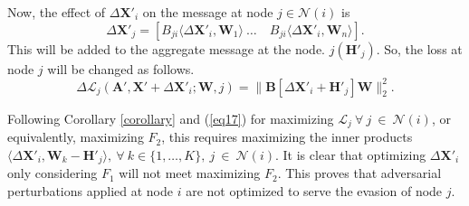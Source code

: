 \documentclass[conference,compsoc]{IEEEtran}
\begin{document}
\par Now, the effect of $\Delta \boldsymbol{X'}_i$ on the message at node $j \in \mathcal{N}(i)$ is
\begin{equation}\label{eq16}
\Delta \boldsymbol{X'}_j=\left[B_{j i} \langle\Delta \boldsymbol{X'}_i, \boldsymbol{W}_1 \rangle~\ldots \quad B_{j i} \langle\Delta \boldsymbol{X'}_i, \boldsymbol{W}_n \rangle\right].
\end{equation}
This will be added to the aggregate message at the node. $j\left(\boldsymbol{H'}_j\right)$. So, the loss at node $j$ will be changed as follows.
\begin{equation}\label{eq17}
\Delta \mathcal{L}_j\left(\boldsymbol{A'}, \boldsymbol{X'}+\Delta \boldsymbol{X'}_i ; \boldsymbol{W}, j\right)=\|\boldsymbol{B}\left[\Delta \boldsymbol{X'}_i+\boldsymbol{H'}_j\right] \boldsymbol{W}\|_2^2. 
\end{equation}

\par Following Corollary \ref{corollary} and (\ref{eq17}) for maximizing $\mathcal{L}_j ~\forall~j~\in~\mathcal{N}(i)$, or equivalently, maximizing $F_2$, this requires maximizing the inner products $ \langle\Delta \boldsymbol{X'}_i, \boldsymbol{W}_k-\boldsymbol{H'}_j \rangle,~\forall~k \in \{1, \ldots, K\},~j~\in~\mathcal{N}(i)$. It is clear that optimizing $\Delta \boldsymbol{X'}_i$ only considering $F_1$ will not meet maximizing $F_2$. This proves that adversarial perturbations applied at node $i$ are not optimized to serve the evasion of node $j$.
\end{document}
